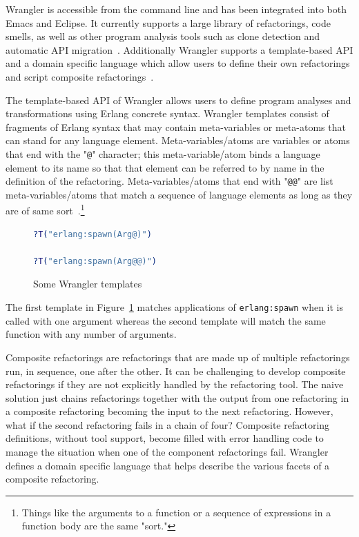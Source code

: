 Wrangler is accessible from the command line and has been integrated into both Emacs and Eclipse. It currently supports a large library of refactorings, code smells, as well as other program analysis tools such as clone detection and automatic API migration~\citep{wrangler}. Additionally Wrangler supports a template-based API and a domain specific language which allow users to define their own refactorings and script composite refactorings~\citep{wranglerDomain}.

The template-based API of Wrangler allows users to define program analyses and transformations using Erlang concrete syntax. Wrangler templates consist of fragments of Erlang syntax that may contain meta-variables or meta-atoms that can stand for any language element. Meta-variables/atoms are variables or atoms that end with the "\texttt{@}" character; this meta-variable/atom binds a language element to its name so that that element can be referred to by name in the definition of the refactoring. Meta-variables/atoms that end with "\texttt{@@}" are list meta-variables/atoms that match a sequence of language elements as long as they are of same sort~\citep{letsUser}.\footnote{Things like the arguments to a function or a sequence of expressions in a function body are the same "sort."}

\begin{figure}[t]
\begin{lstlisting}[language=erlang]
?T("erlang:spawn(Arg@)")

?T("erlang:spawn(Arg@@)")
\end{lstlisting}
\caption{Some Wrangler templates}
\label{templates}
\end{figure}

The first template in Figure~\ref{templates} matches applications of \texttt{erlang:spawn} when it is called with one argument whereas the second template will match the same function with any number of arguments.

Composite refactorings are refactorings that are made up of multiple refactorings run, in sequence, one after the other. It can be challenging to develop composite refactorings if they are not explicitly handled by the refactoring tool. The naive solution just chains refactorings together with the output from one refactoring in a composite refactoring becoming the input to the next refactoring. However, what if the second refactoring fails in a chain of four? Composite refactoring definitions, without tool support, become filled with error handling code to manage the situation when one of the component refactorings fail. Wrangler defines a domain specific language that helps describe the various facets of a composite refactoring.

